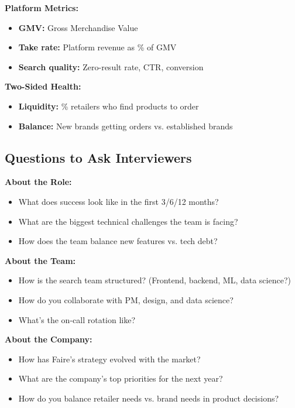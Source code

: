 \documentclass[11pt,letterpaper]{article}
\begin{document}
\textbf{Platform Metrics:}
\begin{itemize}
    \item \textbf{GMV:} Gross Merchandise Value
    \item \textbf{Take rate:} Platform revenue as \% of GMV
    \item \textbf{Search quality:} Zero-result rate, CTR, conversion
\end{itemize}

\textbf{Two-Sided Health:}
\begin{itemize}
    \item \textbf{Liquidity:} \% retailers who find products to order
    \item \textbf{Balance:} New brands getting orders vs. established brands
\end{itemize}

\subsection{Questions to Ask Interviewers}

\textbf{About the Role:}
\begin{itemize}
    \item What does success look like in the first 3/6/12 months?
    \item What are the biggest technical challenges the team is facing?
    \item How does the team balance new features vs. tech debt?
\end{itemize}

\textbf{About the Team:}
\begin{itemize}
    \item How is the search team structured? (Frontend, backend, ML, data science?)
    \item How do you collaborate with PM, design, and data science?
    \item What's the on-call rotation like?
\end{itemize}

\textbf{About the Company:}
\begin{itemize}
    \item How has Faire's strategy evolved with the market?
    \item What are the company's top priorities for the next year?
    \item How do you balance retailer needs vs. brand needs in product decisions?
\end{itemize}
\end{document}
